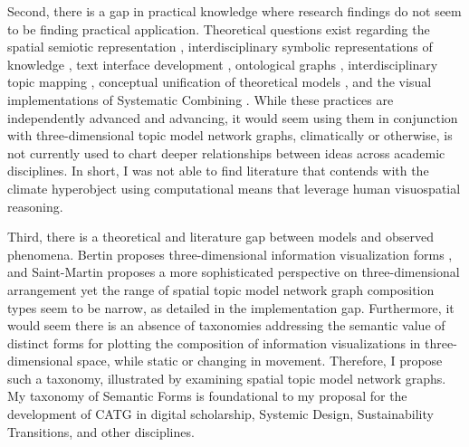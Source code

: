 Second, there is a gap in practical knowledge where research findings do not seem to be finding practical application. Theoretical questions exist regarding the spatial semiotic representation \citep{saint-martin_semiotics_1990}, interdisciplinary symbolic representations of knowledge \citep{anderson_drawing_2018}, text interface development \citep{drucker_graphesis_2014}, ontological graphs \citep[p. 4]{sowa_knowledge_2000}, interdisciplinary topic mapping \citep{adler_great_1952-1}, conceptual unification of theoretical models \citep{wilson_consilience_1999}, and the visual implementations of Systematic Combining \citep{kjode_entanglement_2024}. While these practices are independently advanced and advancing, it would seem using them in conjunction with three-dimensional topic model network graphs, climatically or otherwise, is not currently used to chart deeper relationships between ideas across academic disciplines. In short, I was not able to find literature that contends with the climate hyperobject using computational means that leverage human visuospatial reasoning. 


Third, there is a theoretical and literature gap between models and observed phenomena. Bertin proposes three-dimensional information visualization forms \citep[p. 270]{bertin_semiology_2011}, and Saint-Martin proposes a more sophisticated perspective on three-dimensional arrangement \citep{saint-martin_semiotics_1990} yet the range of spatial topic model network graph composition types seem to be narrow, as detailed in the implementation gap.  Furthermore, it would seem there is an absence of taxonomies addressing the semantic value of distinct forms for plotting the composition of information visualizations in three-dimensional space, while static or changing in movement. Therefore, I propose such a taxonomy, illustrated by examining spatial topic model network graphs. My taxonomy of Semantic Forms is foundational to my proposal for the development of CATG in digital scholarship, Systemic Design, Sustainability Transitions, and other disciplines. 
